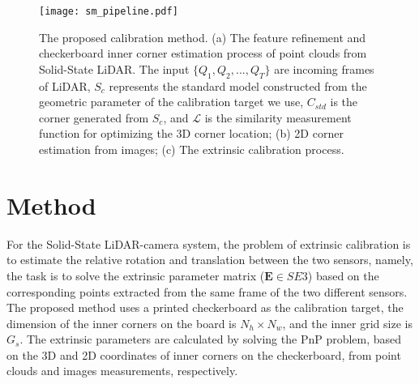 \documentclass[journal]{vgtc}
\begin{document}



\begin{figure*}[!htb]
	\setlength{\abovecaptionskip}{-0.cm}
	\setlength{\belowcaptionskip}{-0.cm}
	\centering
	\texttt{[image: sm\_pipeline.pdf]}\\
	\caption{The proposed calibration method. (a) The feature refinement and checkerboard inner corner estimation process of point clouds from Solid-State LiDAR. The input $\{Q_1,Q_2,...,Q_T\}$ are incoming frames of LiDAR, $S_c$ represents the standard model constructed from the geometric parameter of the calibration target we use, $C_{std}$ is the corner generated from $S_c$, and $\mathcal{L}$ is the similarity measurement function for optimizing the 3D corner location; (b) 2D corner estimation from images; (c) The extrinsic calibration process. }
	\label{fig:pipeline}
	
\end{figure*}




\section{Method}
\label{sec:methods}
For the Solid-State LiDAR-camera system, the problem of extrinsic calibration is to estimate the relative rotation and translation between the two sensors, namely, the task is to solve the extrinsic parameter matrix ($\bm E\in SE3$) based on the corresponding points extracted from the same frame of the two different sensors. The proposed method uses a printed checkerboard as the calibration target, the dimension of the inner corners on the board is $N_h \times N_w$, and the inner grid size is $G_s$. The extrinsic parameters are calculated by solving the PnP problem, based on the 3D and 2D coordinates of inner corners on the checkerboard, from point clouds and images measurements, respectively. 
\end{document}
